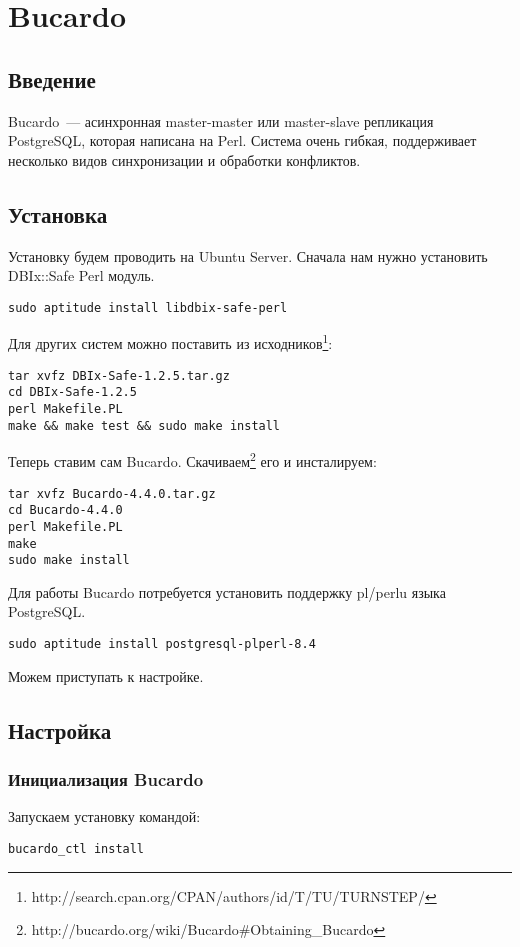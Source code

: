 \section{Bucardo}
\subsection{Введение}
Bucardo~--- асинхронная master-master или master-slave репликация PostgreSQL, которая написана на Perl. 
Система очень гибкая, поддерживает несколько видов синхронизации и обработки конфликтов.

\subsection{Установка}
Установку будем проводить на Ubuntu Server. Сначала нам нужно установить DBIx::Safe Perl модуль.
\begin{lstlisting}[label=lst:bucardo1,caption=Установка]
sudo aptitude install libdbix-safe-perl
\end{lstlisting}

Для других систем можно поставить из исходников\footnote{http://search.cpan.org/CPAN/authors/id/T/TU/TURNSTEP/}:
\begin{lstlisting}[label=lst:bucardo2,caption=Установка]
tar xvfz DBIx-Safe-1.2.5.tar.gz
cd DBIx-Safe-1.2.5
perl Makefile.PL
make && make test && sudo make install
\end{lstlisting}

Теперь ставим сам Bucardo. Скачиваем\footnote{http://bucardo.org/wiki/Bucardo\#Obtaining\_Bucardo} его и инсталируем:
\begin{lstlisting}[label=lst:bucardo3,caption=Установка]
tar xvfz Bucardo-4.4.0.tar.gz
cd Bucardo-4.4.0
perl Makefile.PL
make
sudo make install
\end{lstlisting}

Для работы Bucardo потребуется установить поддержку pl/perlu языка PostgreSQL.
\begin{lstlisting}[label=lst:bucardo4,caption=Установка]
sudo aptitude install postgresql-plperl-8.4
\end{lstlisting}

Можем приступать к настройке.

\subsection{Настройка}
\subsubsection{Инициализация Bucardo}
Запускаем установку командой:
\begin{lstlisting}[label=lst:bucardo5,caption=Инициализация Bucardo]
bucardo_ctl install
\end{lstlisting}

